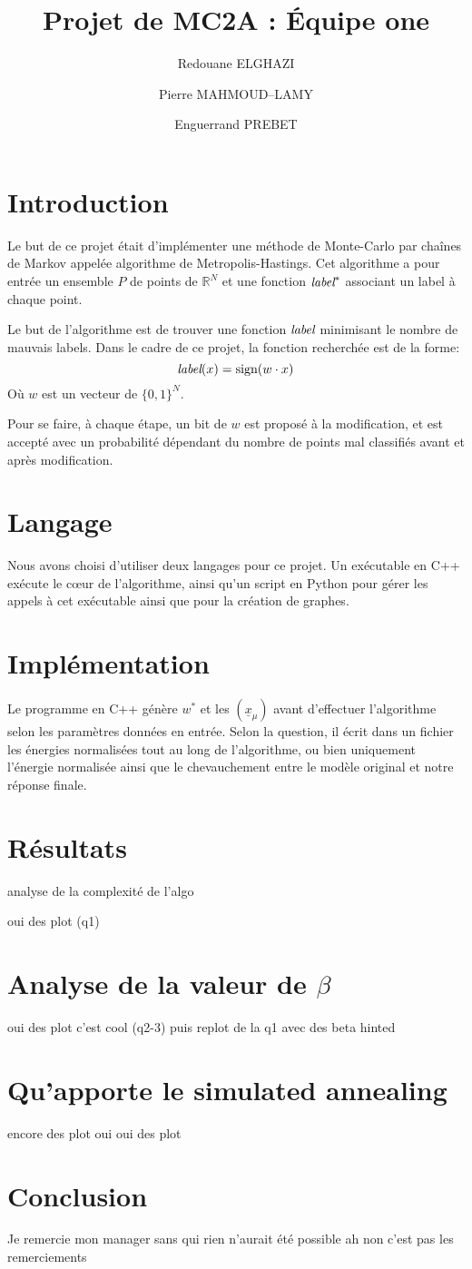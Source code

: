 \documentclass[twocolumn]{article}
\date{}
\author{Redouane ELGHAZI \and Pierre MAHMOUD--LAMY \and Enguerrand PREBET}
\title{Projet de MC2A : Équipe one}
\begin{document}
	\maketitle
	\section{Introduction}
		Le but de ce projet était d'implémenter une méthode de Monte-Carlo par chaînes de Markov appelée algorithme de Metropolis-Hastings. Cet algorithme a pour entrée un ensemble $P$ de points de $\mathbb{R}^N$ et une fonction $\emph{label}^*$ associant un label à chaque point.
		
		Le but de l'algorithme est de trouver une fonction $\emph{label}$ minimisant le nombre de mauvais labels. Dans le cadre de ce projet, la fonction recherchée est de la forme:
		$$\emph{label}(x) = \text{sign}(w\cdot x)$$
		Où $w$ est un vecteur de $\big\{0,1\big\}^N$.
		 
		Pour se faire, à chaque étape, un bit de $w$ est proposé à la modification, et est accepté avec un probabilité dépendant du nombre de points mal classifiés avant et après modification.
	\section{Langage}
		Nous avons choisi d'utiliser deux langages pour ce projet. Un exécutable en C++ exécute le cœur de l'algorithme, ainsi qu'un script en Python pour gérer les appels à cet exécutable ainsi que pour la création de graphes.
		
	\section{Implémentation}
		Le programme en C++ génère $w^*$ et les $(\underline{x}_\mu)$ avant d'effectuer l'algorithme selon les paramètres données en entrée. Selon la question, il écrit dans un fichier les énergies normalisées tout au long de l'algorithme, ou bien uniquement l'énergie normalisée ainsi que le chevauchement entre le modèle original et notre réponse finale. 
	\section{Résultats}
		analyse de la complexité de l'algo
		
		oui des plot (q1)
	\section{Analyse de la valeur de $\beta$}
		oui des plot c'est cool (q2-3)
		puis replot de la q1 avec des beta hinted
	\section{Qu'apporte le simulated annealing}
		encore des plot oui oui des plot
		
	\section{Conclusion}
		Je remercie mon manager sans qui rien n'aurait été possible ah non c'est pas les remerciements
\end{document}
